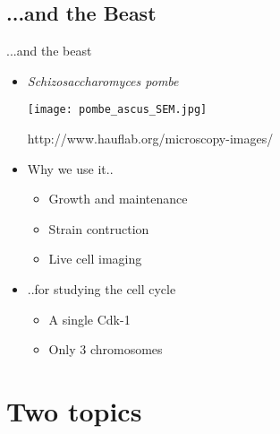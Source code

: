 \subsection{...and the Beast}
\begin{frame}{...and the beast}

\begin{itemize}
\item{ \it Schizosaccharomyces pombe }
\begin{center}
\texttt{[image: pombe\_ascus\_SEM.jpg]}

\tiny{http://www.hauflab.org/microscopy-images/}
\end{center}
\item Why we use it..
\begin{itemize}
\item Growth and maintenance
\item Strain contruction
\item Live cell imaging
\end{itemize}
\item ..for studying the cell cycle
\begin{itemize}
\uncover \item A single Cdk-1
\item Only 3 chromosomes
\end{itemize}
\end{itemize}

\end{frame}

\section{Two topics}
